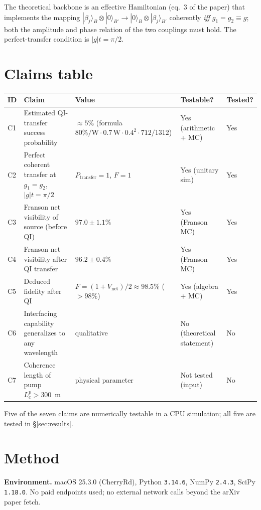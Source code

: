\documentclass[11pt]{article}
\begin{document}
The theoretical backbone is an effective Hamiltonian (eq.~3 of the paper) that
implements the mapping $|\beta_j\rangle_B \otimes |0\rangle_{B'} \to
|0\rangle_B \otimes |\beta_j\rangle_{B'}$ coherently \emph{iff}
$g_1 = g_2 \equiv g$; both the amplitude and phase relation of the two couplings
must hold. The perfect-transfer condition is $|g| t = \pi/2$.

\section{Claims table}

\begin{longtable}{p{} p{} p{} p{} p{}}
\toprule
\textbf{ID} & \textbf{Claim} & \textbf{Value} & \textbf{Testable?} & \textbf{Tested?} \\
\midrule
C1 & Estimated QI-transfer success probability &
    $\approx 5\%$ (formula $80\%/\!\text{W} \cdot 0.7\,\text{W} \cdot 0.4^2 \cdot 712/1312$) &
    Yes (arithmetic + MC) & Yes \\
C2 & Perfect coherent transfer at $g_1 = g_2$, $|g|t=\pi/2$ &
    $P_{\text{transfer}} = 1$, $F = 1$ &
    Yes (unitary sim) & Yes \\
C3 & Franson net visibility of source (before QI) &
    $97.0 \pm 1.1\%$ &
    Yes (Franson MC) & Yes \\
C4 & Franson net visibility after QI transfer &
    $96.2 \pm 0.4\%$ &
    Yes (Franson MC) & Yes \\
C5 & Deduced fidelity after QI &
    $F = (1+V_{\text{net}})/2 \approx 98.5\%$ ($>98\%$) &
    Yes (algebra + MC) & Yes \\
C6 & Interfacing capability generalizes to any wavelength &
    qualitative &
    No (theoretical statement) & No \\
C7 & Coherence length of pump $L_c^p > 300$~m &
    physical parameter &
    Not tested (input) & No \\
\bottomrule
\end{longtable}

Five of the seven claims are numerically testable in a CPU simulation; all five
are tested in \S\ref{sec:results}.

\section{Method}
\label{sec:method}

\textbf{Environment.} macOS 25.3.0 (CherryRd), Python \texttt{3.14.6}, NumPy
\texttt{2.4.3}, SciPy \texttt{1.18.0}. No paid endpoints used; no external
network calls beyond the arXiv paper fetch.
\end{document}
